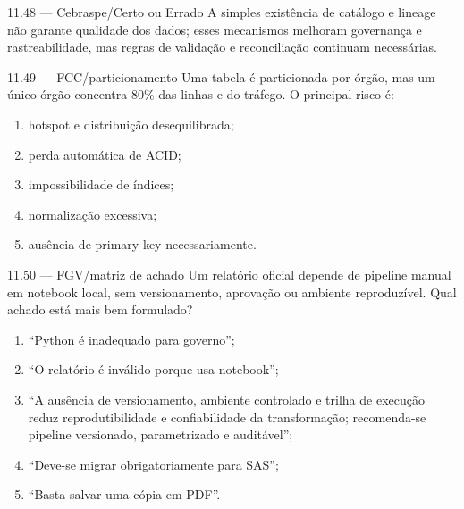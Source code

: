 \begin{questao}{ 11.48 — Cebraspe/Certo ou Errado}
A simples existência de catálogo e lineage não garante qualidade dos dados; esses mecanismos melhoram governança e rastreabilidade, mas regras de validação e reconciliação continuam necessárias.
\end{questao}

\begin{questao}{ 11.49 — FCC/particionamento}
Uma tabela é particionada por órgão, mas um único órgão concentra 80\% das linhas e do tráfego. O principal risco é:
\begin{enumerate}[label=\Alph*)]
\item hotspot e distribuição desequilibrada;
\item perda automática de ACID;
\item impossibilidade de índices;
\item normalização excessiva;
\item ausência de primary key necessariamente.
\end{enumerate}
\end{questao}

\begin{questao}{ 11.50 — FGV/matriz de achado}
Um relatório oficial depende de pipeline manual em notebook local, sem versionamento, aprovação ou ambiente reproduzível. Qual achado está mais bem formulado?
\begin{enumerate}[label=\Alph*)]
\item ``Python é inadequado para governo'';
\item ``O relatório é inválido porque usa notebook'';
\item ``A ausência de versionamento, ambiente controlado e trilha de execução reduz reprodutibilidade e confiabilidade da transformação; recomenda-se pipeline versionado, parametrizado e auditável'';
\item ``Deve-se migrar obrigatoriamente para SAS'';
\item ``Basta salvar uma cópia em PDF''.
\end{enumerate}
\end{questao}